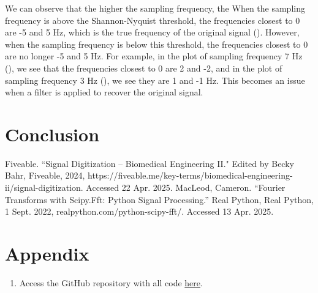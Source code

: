 \documentclass{article}
\begin{document}
We can observe that the higher the sampling frequency, the 
When the sampling frequency is above the Shannon-Nyquist threshold, the frequencies closest to 0 are -5 and 5 Hz, which is the true frequency of the original signal (). %
However, when the sampling frequency is below this threshold, the frequencies closest to 0 are no longer -5 and 5 Hz. 
For example, in the plot of sampling frequency 7 Hz (), we see that the frequencies closest to 0 are 2 and -2, and in the plot of sampling frequency 3 Hz (), we see they are 1 and -1 Hz. 
This becomes an issue when a filter is applied to recover the original signal. 


\section{Conclusion}

\begin{thebibliography}{9}
     Fiveable. ``Signal Digitization -- Biomedical Engineering II." Edited by Becky Bahr, Fiveable, 2024, https://fiveable.me/key-terms/biomedical-engineering-ii/signal-digitization. Accessed 22 Apr. 2025.
     MacLeod, Cameron. “Fourier Transforms with Scipy.Fft: Python Signal Processing.” Real Python, Real Python, 1 Sept. 2022, realpython.com/python-scipy-fft/. Accessed 13 Apr. 2025. 
\end{thebibliography}


\section{Appendix}
\begin{enumerate}
    \item Access the GitHub repository with all code \href{https://github.com/margheritatonon/approximation-II-assignment}{here}.
\end{enumerate}
\end{document}

